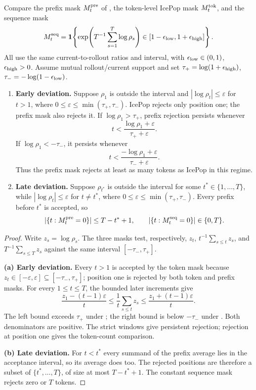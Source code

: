 \begin{theorem}
\label{thm:prefix-tighter}
Compare the prefix mask $M_t^{\rm pre}$ of ,
the token-level IcePop mask $M_t^{\rm tok}$, and the sequence mask
\[
 M_t^{\rm seq}=\mathbf1\!\left\{
 \exp\!\left(T^{-1}\sum_{s=1}^T\log \rho_s\right)
 \in[1-\epsilon_{\mathrm{low}},1+\epsilon_{\mathrm{high}}]\right\}.
\]
All use the same current-to-rollout ratios and interval, with $\epsilon_{\mathrm{low}}\in(0,1)$,
$\epsilon_{\mathrm{high}}>0$. Assume mutual rollout/current support and set
$\tau_+=\log(1+\epsilon_{\mathrm{high}})$, $\tau_-=-\log(1-\epsilon_{\mathrm{low}})$.
\begin{enumerate}
\item[(a)] \textbf{Early deviation.} Suppose $\rho_1$ is outside the interval
and $|\log \rho_t|\le\varepsilon$ for $t>1$, where
$0\le\varepsilon\le\min(\tau_+,\tau_-)$. IcePop rejects only position one; the prefix mask also
rejects it. If $\log \rho_1>\tau_+$, prefix rejection persists whenever
\begin{equation}
 t<\frac{\log \rho_1+\varepsilon}{\tau_++\varepsilon}.
 \label{eq:early-upper-sufficient}
\end{equation}
If $\log \rho_1<-\tau_-$, it persists whenever
\begin{equation}
 t<\frac{-\log \rho_1+\varepsilon}{\tau_-+\varepsilon}.
 \label{eq:early-lower-sufficient}
\end{equation}
Thus the prefix mask rejects at least as many tokens as IcePop in this regime.
\item[(b)] \textbf{Late deviation.} Suppose $\rho_{t^*}$ is outside the interval
for some $t^*\in\{1,\ldots,T\}$, while
$|\log \rho_t|\le\varepsilon$ for $t\ne t^*$, where
$0\le\varepsilon\le\min(\tau_+,\tau_-)$. Every prefix before $t^*$ is accepted, so
\[
 |\{t:M_t^{\rm pre}=0\}|\le T-t^*+1,
 \qquad |\{t:M_t^{\rm seq}=0\}|\in\{0,T\}.
\]
\end{enumerate}
\end{theorem}
\label{app:prefix-proof}
\begin{proof}
Write $z_s=\log \rho_s$. The three masks test, respectively,
$z_t$, $t^{-1}\sum_{s\le t}z_s$, and $T^{-1}\sum_{s\le T}z_s$
against the same interval $[-\tau_-,\tau_+]$.

\textbf{(a) Early deviation.}
Every $t>1$ is accepted by the token mask because
$z_t\in[-\varepsilon,\varepsilon]\subseteq[-\tau_-,\tau_+]$;
position one is rejected by both token and prefix masks.
For every $1\le t\le T$, the bounded later increments give
\[
 \frac{z_1-(t-1)\varepsilon}{t}
 \le \frac1t\sum_{s\le t}z_s
 \le \frac{z_1+(t-1)\varepsilon}{t}.
\]
The left bound exceeds $\tau_+$ under
; the right bound is below $-\tau_-$
under . Both denominators are positive. The strict windows give persistent
rejection; rejection at position one gives the token-count comparison.

\textbf{(b) Late deviation.}
For $t<t^*$ every summand of the prefix average lies in the acceptance
interval, so its average does too. The rejected positions are therefore
a subset of $\{t^*,\ldots,T\}$, of size at most $T-t^*+1$.
The constant sequence mask rejects zero or $T$ tokens.
\end{proof}

